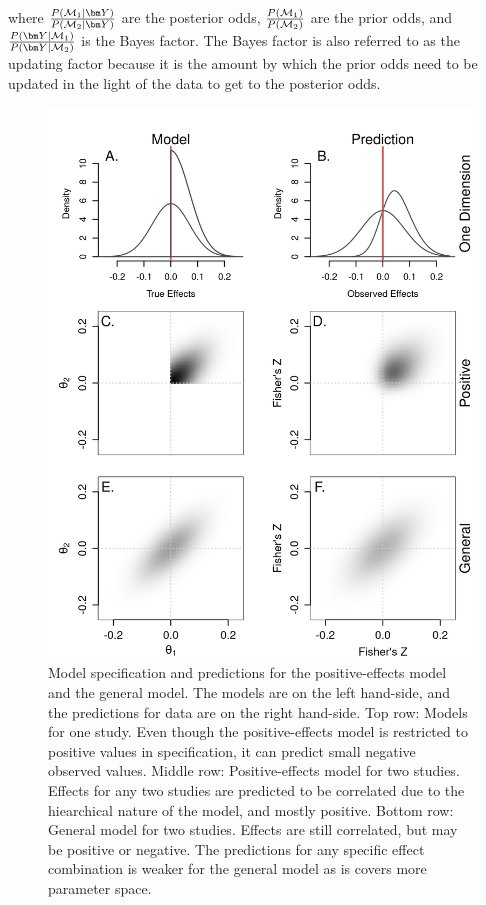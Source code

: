 \documentclass[english,,man]{apa6}
\begin{document}
where \(\frac{P({\cal M}_1 \mid \bm Y)}{P({\cal M}_2 \mid \bm Y)}\) are the posterior odds, \(\frac{P({\cal M}_1)}{P({\cal M}_2)}\) are the prior odds, and \(\frac{P(\bm Y\mid {\cal M}_1)}{P(\bm Y\mid {\cal M}_2)}\) is the Bayes factor. The Bayes factor is also referred to as the updating factor because it is the amount by which the prior odds need to be updated in the light of the data to get to the posterior odds.

\begin{figure}
\centering
\includegraphics{p_files/figure-latex/meta-modelcomp-1.png}
\caption{\label{fig:meta-modelcomp}Model specification and predictions for the positive-effects model and the general model. The models are on the left hand-side, and the predictions for data are on the right hand-side. Top row: Models for one study. Even though the positive-effects model is restricted to positive values in specification, it can predict small negative observed values. Middle row: Positive-effects model for two studies. Effects for any two studies are predicted to be correlated due to the hiearchical nature of the model, and mostly positive. Bottom row: General model for two studies. Effects are still correlated, but may be positive or negative. The predictions for any specific effect combination is weaker for the general model as is covers more parameter space.}
\end{figure}
\end{document}
